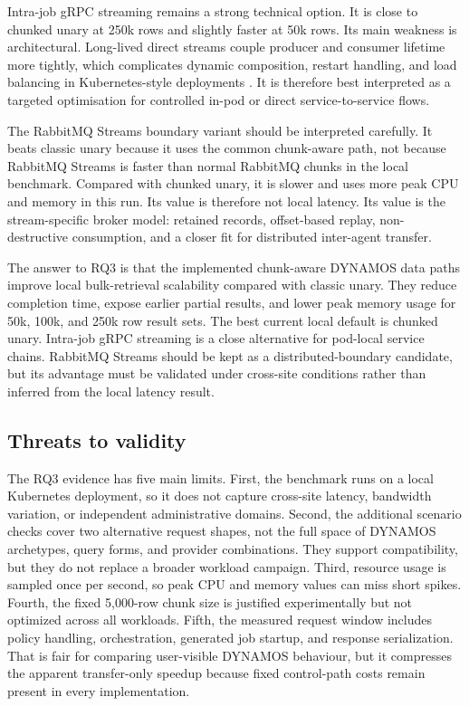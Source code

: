 Intra-job gRPC streaming remains a strong technical option. It is close to chunked unary at 250k rows and slightly faster at 50k rows. Its main weakness is architectural. Long-lived direct streams couple producer and consumer lifetime more tightly, which complicates dynamic composition, restart handling, and load balancing in Kubernetes-style deployments \cite{starck2023streaminglb}. It is therefore best interpreted as a targeted optimisation for controlled in-pod or direct service-to-service flows.

The RabbitMQ Streams boundary variant should be interpreted carefully. It beats classic unary because it uses the common chunk-aware path, not because RabbitMQ Streams is faster than normal RabbitMQ chunks in the local benchmark. Compared with chunked unary, it is slower and uses more peak CPU and memory in this run. Its value is therefore not local latency. Its value is the stream-specific broker model: retained records, offset-based replay, non-destructive consumption, and a closer fit for distributed inter-agent transfer.

The answer to RQ3 is that the implemented chunk-aware DYNAMOS data paths improve local bulk-retrieval scalability compared with classic unary. They reduce completion time, expose earlier partial results, and lower peak memory usage for 50k, 100k, and 250k row result sets. The best current local default is chunked unary. Intra-job gRPC streaming is a close alternative for pod-local service chains. RabbitMQ Streams should be kept as a distributed-boundary candidate, but its advantage must be validated under cross-site conditions rather than inferred from the local latency result.

\subsection{Threats to validity}

The RQ3 evidence has five main limits. First, the benchmark runs on a local Kubernetes deployment, so it does not capture cross-site latency, bandwidth variation, or independent administrative domains. Second, the additional scenario checks cover two alternative request shapes, not the full space of DYNAMOS archetypes, query forms, and provider combinations. They support compatibility, but they do not replace a broader workload campaign. Third, resource usage is sampled once per second, so peak CPU and memory values can miss short spikes. Fourth, the fixed 5{,}000-row chunk size is justified experimentally but not optimized across all workloads. Fifth, the measured request window includes policy handling, orchestration, generated job startup, and response serialization. That is fair for comparing user-visible DYNAMOS behaviour, but it compresses the apparent transfer-only speedup because fixed control-path costs remain present in every implementation.
